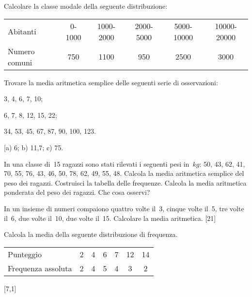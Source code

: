 \begin{esercizio}
\label{ese:A.23}
Calcolare la classe modale della seguente distribuzione:
\begin{center}
\begin{tabular}{l*{5}{c}}
\toprule
Abitanti & 0-1000& 1000-2000& 2000-5000 & 5000-10000& 10000-20000 \\
Numero comuni & 750 & 1100 & 950 & 2500 & 3000 \\
\bottomrule
\end{tabular}
\end{center}
\end{esercizio}

\begin{esercizio}[\Ast]
\label{ese:A.24}
Trovare la media aritmetica semplice delle seguenti serie di osservazioni:
\begin{multicols}{3}
\begin{enumeratea}
 \item 3, 4, 6, 7, 10;
 \item 6, 7, 8, 12, 15, 22;
 \item 34, 53, 45, 67, 87, 90, 100, 123.
\end{enumeratea}
\end{multicols}
\hfill [a) 6; \quad b) 11,7; \quad c) 75.
\end{esercizio}

\begin{esercizio}
\label{ese:A.25}
In una classe di~15 ragazzi sono stati rilevati i seguenti pesi 
in~$\unit{kg}$:
50, 43, 62, 41, 70, 55, 76, 43, 46, 50, 78, 62, 49, 55, 48.
Calcola la media aritmetica semplice del peso dei ragazzi. Costruisci la 
tabella delle frequenze.
Calcola la media aritmetica ponderata del peso dei ragazzi. Che cosa 
osservi?
\end{esercizio}

\begin{esercizio}[\Ast]
\label{ese:A.26}
In un insieme di numeri compaiono quattro volte il~3, cinque volte il~5, 
tre volte il~6, due volte il~10, due volte il~15. Calcolare la media 
aritmetica.
\hfill [21]
\end{esercizio}

\begin{esercizio}[\Ast]
\label{ese:A.27}
Calcola la media della seguente distribuzione di frequenza.
\begin{center}
 \begin{tabular}{l*{6}{c}}
\toprule
Punteggio & 2 & 4 & 6 & 7 & 12 & 14 \\
Frequenza assoluta & 2 & 4 & 5 & 4 & 3 & 2 \\
\bottomrule
\end{tabular}
\end{center}
\hfill [7,1]
\end{esercizio}

